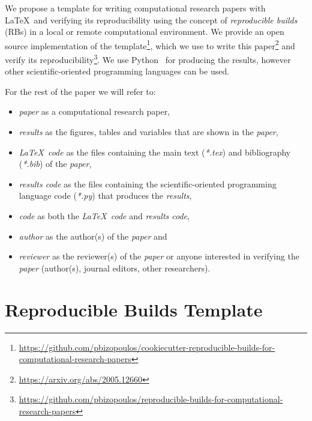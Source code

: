 \documentclass[journal]{IEEEtran}
\begin{document}
We propose a template for writing computational research papers with \LaTeX\ and verifying  its reproducibility using the concept of \textit{reproducible builds} (RBs) in a local or remote computational environment.
We provide an open source implementation of the template\footnote{\url{https://github.com/pbizopoulos/cookiecutter-reproducible-builds-for-computational-research-papers}}, which we use to write this paper\footnote{\url{https://arxiv.org/abs/2005.12660}} and verify its reproducibility\footnote{\url{https://github.com/pbizopoulos/reproducible-builds-for-computational-research-papers}}.
We use Python~\cite{van2007python} for producing the results, however other scientific-oriented programming languages can be used.

For the rest of the paper we will refer to:
\begin{itemize}
	\item \textit{paper} as a computational research paper,
	\item \textit{results} as the figures, tables and variables that are shown in the \textit{paper},
	\item \textit{\LaTeX\ code} as the files containing the main text (\textit{*.tex}) and bibliography (\textit{*.bib}) of the \textit{paper},
	\item \textit{results code} as the files containing the scientific-oriented programming language code (\textit{*.py}) that produces the \textit{results},
	\item \textit{code} as both the \textit{\LaTeX\ code} and \textit{results code},
	\item \textit{author} as the author(s) of the \textit{paper} and
	\item \textit{reviewer} as the reviewer(s) of the \textit{paper} or anyone interested in verifying the \textit{paper} (author(s), journal editors, other researchers).
\end{itemize}

\section{Reproducible Builds Template}
\end{document}
